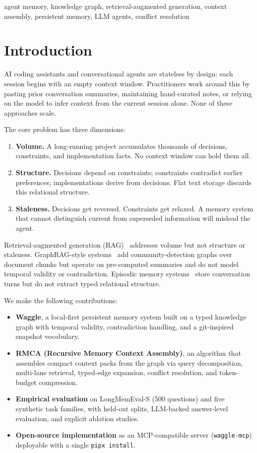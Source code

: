 \documentclass[conference]{IEEEtran}
\begin{document}
\begin{IEEEkeywords}
agent memory, knowledge graph, retrieval-augmented generation, context assembly,
persistent memory, LLM agents, conflict resolution
\end{IEEEkeywords}

\section{Introduction}

AI coding assistants and conversational agents are stateless by design: each session begins
with an empty context window. Practitioners work around this by pasting prior conversation
summaries, maintaining hand-curated notes, or relying on the model to infer context from
the current session alone. None of these approaches scale.

The core problem has three dimensions:
\begin{enumerate}
\item \textbf{Volume.} A long-running project accumulates thousands of decisions, constraints,
and implementation facts. No context window can hold them all.
\item \textbf{Structure.} Decisions depend on constraints; constraints contradict earlier
preferences; implementations derive from decisions. Flat text storage discards this relational
structure.
\item \textbf{Staleness.} Decisions get reversed. Constraints get relaxed. A memory system
that cannot distinguish current from superseded information will mislead the agent.
\end{enumerate}

Retrieval-augmented generation (RAG)~\cite{lewis2020rag} addresses volume but not structure
or staleness. GraphRAG-style systems~\cite{edge2024graphrag} add community-detection graphs
over document chunks but operate on pre-computed summaries and do not model temporal validity
or contradiction. Episodic memory systems~\cite{packer2023memgpt,park2023generative} store
conversation turns but do not extract typed relational structure.

We make the following contributions:
\begin{itemize}
\item \textbf{Waggle}, a local-first persistent memory system built on a typed knowledge graph
with temporal validity, contradiction handling, and a git-inspired snapshot vocabulary.
\item \textbf{RMCA (Recursive Memory Context Assembly)}, an algorithm that assembles compact
context packs from the graph via query decomposition, multi-lane retrieval, typed-edge
expansion, conflict resolution, and token-budget compression.
\item \textbf{Empirical evaluation} on LongMemEval-S (500 questions) and five synthetic task
families, with held-out splits, LLM-backed answer-level evaluation, and explicit ablation
studies.
\item \textbf{Open-source implementation} as an MCP-compatible server (\texttt{waggle-mcp})
deployable with a single \texttt{pipx install}.
\end{itemize}
\end{document}
